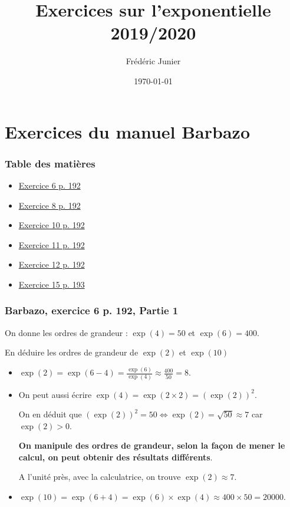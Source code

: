 \documentclass[11pt, hyperref={urlcolor=red,%
            linkcolor=blue, %
            colorlinks=true}]{beamer}
\title[exponentielle]{Exercices sur l'exponentielle 2019/2020}
\author[F.Junier]{Fr\'ed\'eric Junier}
\institute[Le Parc]{{\centering Lyc\'ee du Parc \\
1 Boulevard Anatole France \\ 69006 Lyon }}
\date[\today]{\today}
\begin{document}
\frame{\titlepage}

\section{Exercices du manuel Barbazo}

\label{barbazo}


\begin{frame}
\frametitle{Table des matières}
\begin{itemize}
	\item \hyperlink{exo6}{Exercice 6 p. 192}
    \item \hyperlink{exo8}{Exercice 8 p. 192}
    \item \hyperlink{exo10}{Exercice 10 p. 192}
    \item \hyperlink{exo11}{Exercice 11 p. 192}
    \item \hyperlink{exo12}{Exercice 12 p. 192}
    \item \hyperlink{exo15}{Exercice 15  p. 193}
    
\end{itemize}

\end{frame}

\begin{frame}
\label{exo6}
\frametitle{Barbazo, exercice 6 p. 192, Partie 1}

On donne les ordres de grandeur : $\exp(4)=50$ et $\exp(6)=400$.

En déduire les ordres de grandeur de $\exp(2)$ et $\exp(10)$

\begin{itemize}
	\item $\exp(2) = \exp(6-4)=\frac{\exp(6)}{\exp(4)}\approx \frac{400}{50}=8$.
	\item On peut aussi écrire $\exp(4) = \exp(2 \times 2)=\left(\exp(2)\right)^{2}$.
	
	On en déduit que $\left(\exp(2)\right)^{2}=50 \Leftrightarrow \exp(2)=\sqrt{50} \approx 7$ car $\exp(2)>0$.
	
	
\textbf{On manipule des ordres de grandeur, selon la façon de mener le calcul, on peut obtenir des résultats différents}.

A l'unité près, avec la calculatrice, on trouve $\exp(2) \approx 7$.

	\item $\exp(10)=\exp(6 + 4)=\exp(6) \times \exp(4) \approx 400 \times 50 = 20000$.




	
\end{itemize}
\end{frame}
\end{document}
